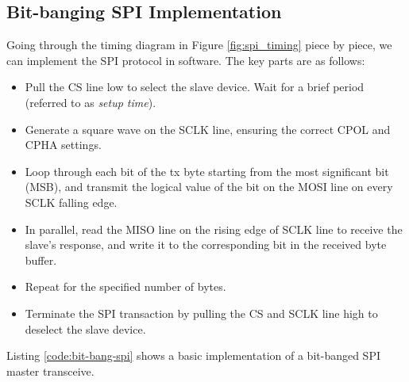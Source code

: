 \documentclass[main.tex]{subfiles}
\begin{document}
\subsection{Bit-banging SPI Implementation}
Going through the timing diagram in Figure \ref{fig:spi_timing} piece by piece, we can implement the SPI protocol in software. The key parts are as follows:
\begin{itemize}
    \item Pull the CS line low to select the slave device. Wait for a brief period (referred to as \textit{setup time}).
    \item Generate a square wave on the SCLK line, ensuring the correct CPOL and CPHA settings.
    \item Loop through each bit of the tx byte starting from the most significant bit (MSB), and transmit the logical value of the bit on the MOSI line on every SCLK falling edge.
    \item In parallel, read the MISO line on the rising edge of SCLK line to receive the slave's response, and write it to the corresponding bit in the received byte buffer. 
    \item Repeat for the specified number of bytes.
    \item Terminate the SPI transaction by pulling the CS and SCLK line high to deselect the slave device.
\end{itemize}

\noindent Listing \ref{code:bit-bang-spi} shows a basic implementation of a bit-banged SPI master transceive.


\end{document}
